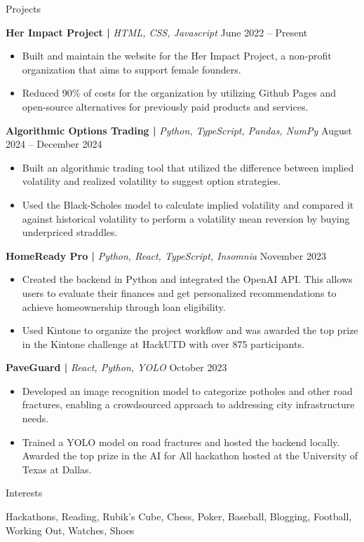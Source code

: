 \documentclass[]{mcdowellcv}
\begin{document}
	\begin{cvsection}{Projects}
		\begin{cvsubsection}{}{}{}	
				\textbf{Her Impact Project | }\textit{HTML, CSS, Javascript} \hfill{June 2022 -- Present}
				\begin{itemize}
					\item Built and maintain the website for the Her Impact Project, a non-profit organization that aims to support female founders.
					\smallskip
					\item Reduced 90\% of costs for the organization by utilizing Github Pages and open-source alternatives for previously paid products and services.
				\end{itemize}
				\medskip
				\textbf{Algorithmic Options Trading | }\textit{Python, TypeScript, Pandas, NumPy} \hfill{August 2024 -- December 2024}
				\begin{itemize}
					\item Built an algorithmic trading tool that utilized the difference between implied volatility and realized volatility to suggest option strategies.
					\smallskip
					\item Used the Black-Scholes model to calculate implied volatility and compared it against historical volatility to perform a volatility mean reversion by buying underpriced straddles.
				\end{itemize}
				\medskip
				\textbf{HomeReady Pro | }\textit{Python, React, TypeScript, Insomnia} \hfill{November 2023} 
				\begin{itemize}
					\item Created the backend in Python and integrated the OpenAI API. This allows users to evaluate their finances and get personalized recommendations to achieve homeownership through loan eligibility. 
					\smallskip
					\item Used Kintone to organize the project workflow and was awarded the top prize in the Kintone challenge at HackUTD with over 875 participants.
				\end{itemize}
				\medskip
				\textbf{PaveGuard | }\textit{React, Python, YOLO} \hfill{October 2023}
				\begin{itemize}
					\item Developed an image recognition model to categorize potholes and other road fractures, enabling a crowdsourced approach to addressing city infrastructure needs.
					\smallskip
					\item Trained a YOLO model on road fractures and hosted the backend locally. Awarded the top prize in the AI for All hackathon hosted at the University of Texas at Dallas.
				\end{itemize}
		\end{cvsubsection}
	\end{cvsection}

	\begin{cvsection}{Interests}
		\begin{cvsubsection}{}{}{}
			\medskip
				Hackathons, Reading, Rubik's Cube, Chess, Poker, Baseball, Blogging, Football, Working Out, Watches, Shoes
		\end{cvsubsection}
	\end{cvsection}

	
\end{document}
